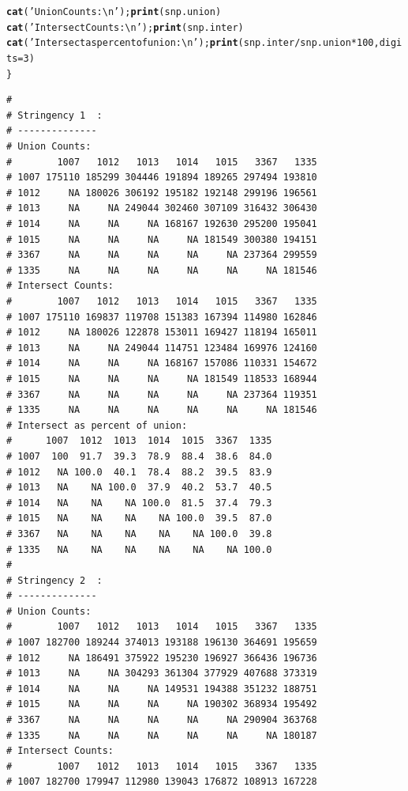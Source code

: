 \documentclass{article}\usepackage[]{graphicx}\usepackage[]{color}
\makeatletter
\newcommand{\hlnum}[1]{\textcolor[rgb]{0.686,0.059,0.569}{#1}}%
\newcommand{\hlstr}[1]{\textcolor[rgb]{0.192,0.494,0.8}{#1}}%
\newcommand{\hlopt}[1]{\textcolor[rgb]{0,0,0}{#1}}%
\newcommand{\hlstd}[1]{\textcolor[rgb]{0.345,0.345,0.345}{#1}}%
\newcommand{\hlkwc}[1]{\textcolor[rgb]{0.333,0.667,0.333}{#1}}%
\newcommand{\hlkwd}[1]{\textcolor[rgb]{0.737,0.353,0.396}{\textbf{#1}}}%
\newenvironment{kframe}{%
 \def\at@end@of@kframe{}%
 \ifinner\ifhmode%
  \def\at@end@of@kframe{\end{minipage}}%
  \begin{minipage}{\columnwidth}%
 \fi\fi%
 \def\FrameCommand##1{\hskip\@totalleftmargin \hskip-\fboxsep
 \colorbox{shadecolor}{##1}\hskip-\fboxsep
     \hskip-\linewidth \hskip-\@totalleftmargin \hskip\columnwidth}%
 \MakeFramed {\advance\hsize-\width
   \@totalleftmargin\z@ \linewidth\hsize
   \@setminipage}}%
 {\par\unskip\endMakeFramed%
 \at@end@of@kframe}
\newenvironment{knitrout}{}{} %
\makeatother
\begin{document}
\begin{knitrout}
\begin{kframe}
\begin{alltt}
  \hlkwd{cat}\hlstd{(}\hlstr{'Union Counts:\textbackslash{}n'}\hlstd{);}                  \hlkwd{print}\hlstd{(snp.union)}
  \hlkwd{cat}\hlstd{(}\hlstr{'Intersect Counts:\textbackslash{}n'}\hlstd{);}              \hlkwd{print}\hlstd{(snp.inter)}
  \hlkwd{cat}\hlstd{(}\hlstr{'Intersect as percent of union:\textbackslash{}n'}\hlstd{);} \hlkwd{print}\hlstd{(snp.inter}\hlopt{/}\hlstd{snp.union}\hlopt{*}\hlnum{100}\hlstd{,}\hlkwc{digits}\hlstd{=}\hlnum{3}\hlstd{)}
\hlstd{\}}
\end{alltt}
\begin{verbatim}
# 
# Stringency 1  :
# --------------
# Union Counts:
#        1007   1012   1013   1014   1015   3367   1335
# 1007 175110 185299 304446 191894 189265 297494 193810
# 1012     NA 180026 306192 195182 192148 299196 196561
# 1013     NA     NA 249044 302460 307109 316432 306430
# 1014     NA     NA     NA 168167 192630 295200 195041
# 1015     NA     NA     NA     NA 181549 300380 194151
# 3367     NA     NA     NA     NA     NA 237364 299559
# 1335     NA     NA     NA     NA     NA     NA 181546
# Intersect Counts:
#        1007   1012   1013   1014   1015   3367   1335
# 1007 175110 169837 119708 151383 167394 114980 162846
# 1012     NA 180026 122878 153011 169427 118194 165011
# 1013     NA     NA 249044 114751 123484 169976 124160
# 1014     NA     NA     NA 168167 157086 110331 154672
# 1015     NA     NA     NA     NA 181549 118533 168944
# 3367     NA     NA     NA     NA     NA 237364 119351
# 1335     NA     NA     NA     NA     NA     NA 181546
# Intersect as percent of union:
#      1007  1012  1013  1014  1015  3367  1335
# 1007  100  91.7  39.3  78.9  88.4  38.6  84.0
# 1012   NA 100.0  40.1  78.4  88.2  39.5  83.9
# 1013   NA    NA 100.0  37.9  40.2  53.7  40.5
# 1014   NA    NA    NA 100.0  81.5  37.4  79.3
# 1015   NA    NA    NA    NA 100.0  39.5  87.0
# 3367   NA    NA    NA    NA    NA 100.0  39.8
# 1335   NA    NA    NA    NA    NA    NA 100.0
# 
# Stringency 2  :
# --------------
# Union Counts:
#        1007   1012   1013   1014   1015   3367   1335
# 1007 182700 189244 374013 193188 196130 364691 195659
# 1012     NA 186491 375922 195230 196927 366436 196736
# 1013     NA     NA 304293 361304 377929 407688 373319
# 1014     NA     NA     NA 149531 194388 351232 188751
# 1015     NA     NA     NA     NA 190302 368934 195492
# 3367     NA     NA     NA     NA     NA 290904 363768
# 1335     NA     NA     NA     NA     NA     NA 180187
# Intersect Counts:
#        1007   1012   1013   1014   1015   3367   1335
# 1007 182700 179947 112980 139043 176872 108913 167228

\end{verbatim}
\end{kframe}
\end{knitrout}
\end{document}
